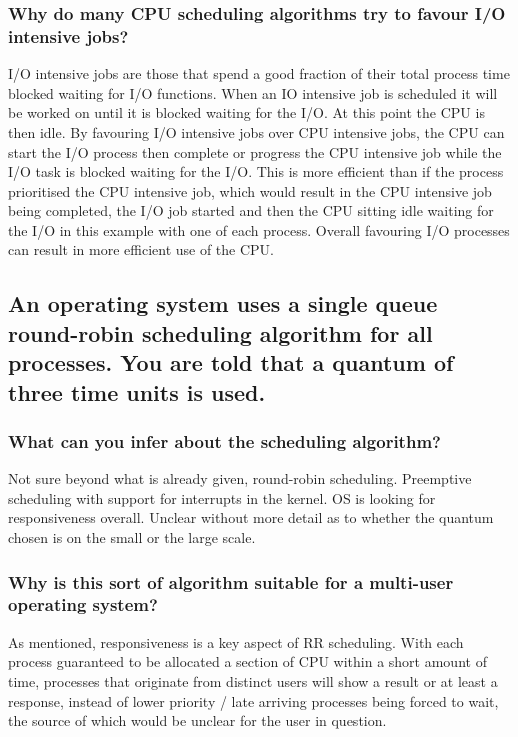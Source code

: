 \documentclass[]{article}
\begin{document}
        \newpage
        \subsubsection{Why do many CPU scheduling algorithms try to favour I/O intensive jobs?}

        I/O intensive jobs are those that spend a good fraction of their total process time blocked waiting for I/O functions. When an IO intensive job is scheduled it will be worked on until it is blocked waiting for the I/O. At this point the CPU is then idle. By favouring I/O intensive jobs over CPU intensive jobs, the CPU can start the I/O process then complete or progress the CPU intensive job while the I/O task is blocked waiting for the I/O. This is more efficient than if the process prioritised the CPU intensive job, which would result in the CPU intensive job being completed, the I/O job started and then the CPU sitting idle waiting for the I/O in this example with one of each process. Overall favouring I/O processes can result in more efficient use of the CPU.

    \subsection{An operating system uses a single queue round-robin scheduling algorithm for all processes. You are told that a quantum of three time units is used.}

        \subsubsection{What can you infer about the scheduling algorithm?}

        Not sure beyond what is already given, round-robin scheduling. Preemptive scheduling with support for interrupts in the kernel. OS is looking for responsiveness overall. Unclear without more detail as to whether the quantum chosen is on the small or the large scale.

        \subsubsection{Why is this sort of algorithm suitable for a multi-user operating system?}

        As mentioned, responsiveness is a key aspect of RR scheduling. With each process guaranteed to be allocated a section of CPU within a short amount of time, processes that originate from distinct users will show a result or at least a response, instead of lower priority / late arriving processes being forced to wait, the source of which would be unclear for the user in question.
\end{document}
